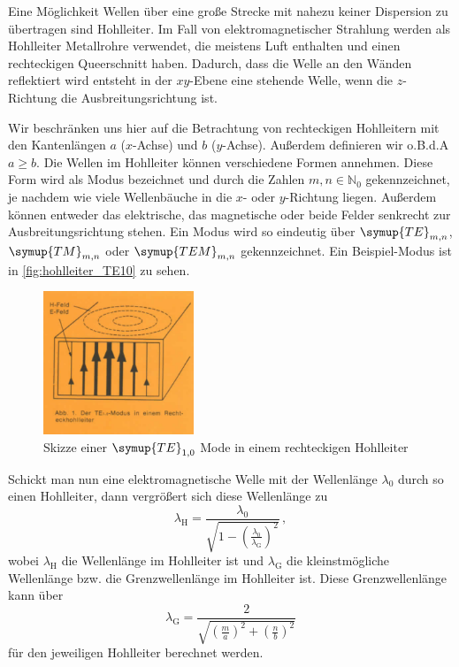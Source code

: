 Eine Möglichkeit Wellen über eine große Strecke mit nahezu keiner Dispersion zu übertragen sind Hohlleiter.
Im Fall von elektromagnetischer Strahlung werden als Hohlleiter Metallrohre verwendet, die meistens Luft enthalten und einen rechteckigen Queerschnitt haben.
Dadurch, dass die Welle an den Wänden reflektiert wird entsteht in der $xy$-Ebene eine stehende Welle, wenn die $z$-Richtung die Ausbreitungsrichtung ist.

Wir beschränken uns hier auf die Betrachtung von rechteckigen Hohlleitern mit den Kantenlängen $a$ ($x$-Achse) und $b$ ($y$-Achse).
Außerdem definieren wir o.B.d.A $a \geq b$.
Die Wellen im Hohlleiter können verschiedene Formen annehmen. 
Diese Form wird als Modus bezeichnet und durch die Zahlen $m,n \in \mathbb{N}_0$ gekennzeichnet, je nachdem wie viele Wellenbäuche in die $x$- oder $y$-Richtung liegen.
Außerdem können entweder das elektrische, das magnetische oder beide Felder senkrecht zur Ausbreitungsrichtung stehen.
Ein Modus wird so eindeutig über $\symup{TE}_{m,n}$, $\symup{TM}_{m,n}$ oder $\symup{TEM}_{m,n}$ gekennzeichnet. 
Ein Beispiel-Modus ist in \autoref{fig:hohlleiter_TE10} zu sehen.

\begin{figure}
    \centering
    \includegraphics[width=0.4\textwidth]{images/hohlleiter_TE10.png}
    \caption{Skizze einer $\symup{TE}_{1,0}$ Mode in einem rechteckigen Hohlleiter \cite{V53_old}}
    \label{fig:hohlleiter_TE10}
\end{figure}

Schickt man nun eine elektromagnetische Welle mit der Wellenlänge $\lambda_0$ durch so einen Hohlleiter,
dann vergrößert sich diese Wellenlänge zu
\begin{equation}
    \lambda_\text{H} = \frac{\lambda_0}{ \sqrt{ 1 - \left( \frac{\lambda_0}{\lambda_\text{G}} \right)^2 } } \, ,
\end{equation}
wobei $\lambda_\text{H}$ die Wellenlänge im Hohlleiter ist und $\lambda_\text{G}$ die kleinstmögliche Wellenlänge bzw. die Grenzwellenlänge im Hohlleiter ist.
Diese Grenzwellenlänge kann über
\begin{equation}
    \lambda_\text{G} = \frac{2}{ \sqrt{ \left( \frac{m}{a} \right)^2 + \left( \frac{n}{b} \right)^2 } }
\end{equation}
für den jeweiligen Hohlleiter berechnet werden.

